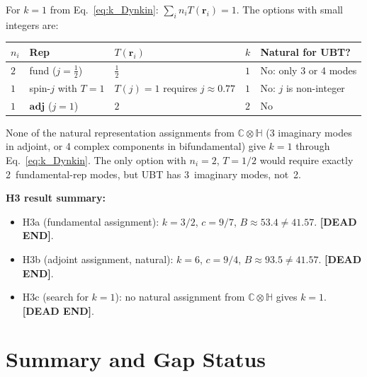 \documentclass[11pt,a4paper]{article}
\theoremstyle{definition}
\theoremstyle{remark}
\begin{document}
For $k = 1$ from Eq.~\eqref{eq:k_Dynkin}:
$\sum_i n_i T(\mathbf{r}_i) = 1$.
The options with small integers are:
\begin{center}
\begin{tabular}{lllll}
  \toprule
  $n_i$ & Rep & $T(\mathbf{r}_i)$ & $k$ & Natural for UBT? \\
  \midrule
  $2$ & fund ($j=\tfrac{1}{2}$) & $\tfrac{1}{2}$ & $1$ & No: only 3 or 4 modes \\
  $1$ & spin-$j$ with $T=1$ & $T(j)=1$ requires $j\approx 0.77$ & $1$ & No: $j$ is non-integer \\
  $1$ & $\mathbf{adj}$ ($j=1$) & $2$ & $2$ & No \\
  \bottomrule
\end{tabular}
\end{center}
None of the natural representation assignments from $\mathbb{C}\otimes\mathbb{H}$
(3 imaginary modes in adjoint, or 4 complex components in bifundamental)
give $k = 1$ through Eq.~\eqref{eq:k_Dynkin}.
The only option with $n_i = 2$, $T = 1/2$ would require exactly
2~fundamental-rep modes, but UBT has 3~imaginary modes, not~2.

\textbf{H3 result summary:}
\begin{itemize}
  \item H3a (fundamental assignment):
    $k = 3/2$, $c = 9/7$, $B \approx 53.4 \neq 41.57$.
    \textbf{[DEAD END]}.
  \item H3b (adjoint assignment, natural):
    $k = 6$, $c = 9/4$, $B \approx 93.5 \neq 41.57$.
    \textbf{[DEAD END]}.
  \item H3c (search for $k=1$):
    no natural assignment from $\mathbb{C}\otimes\mathbb{H}$ gives $k=1$.
    \textbf{[DEAD END]}.
\end{itemize}

\section{Summary and Gap Status}
\label{sec:summary}
\end{document}
